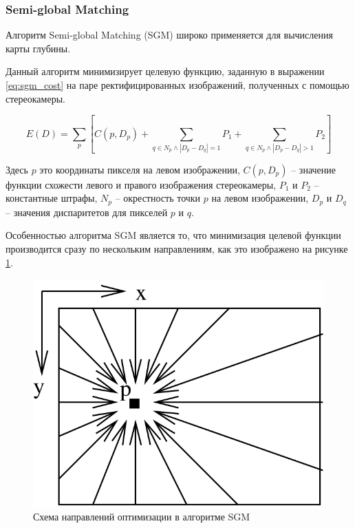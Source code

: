 \documentclass[aps,%
14pt,%
final,%
oneside,
onecolumn,%
musixtex, %
superscriptaddress,%
centertags]{extarticle} %
\begin{document}
\subsubsection{Semi-global Matching}
Алгоритм Semi-global Matching \cite{hirschmuller2005accurate} (SGM) широко применяется для вычисления карты глубины.

Данный алгоритм минимизирует целевую функцию, заданную в выражении \ref{eq:sgm_cost} на паре ректифицированных изображений, полученных с помощью стереокамеры.

\begin{equation} \label{eq:sgm_cost}
E(D)=\sum_p [C(p, D_p) + \sum_{q \in N_p \land |D_p - D_q| = 1} P_1 + \sum_{q \in N_p \land |D_p - D_q| > 1} P_2]
\end{equation}

Здесь $p$ это координаты пикселя на левом изображении, $C(p, D_p)$ -- значение функции схожести левого и правого изображения стереокамеры, $P_1$ и $P_2$ -- константные штрафы, $N_p$ -- окрестность точки $p$ на левом изображении, $D_p$ и $D_q$ -- значения диспаритетов для пикселей $p$ и $q$.

Особенностью алгоритма SGM является то, что минимизация целевой функции производится сразу по нескольким направлениям, как это изображено на рисунке \ref{fig:sgm_paths}.

\begin{figure}[htp]
\centering
\includegraphics[scale=0.3]{sgm_paths.png}
\caption{Схема направлений оптимизации в алгоритме SGM \cite{hirschmuller2005accurate}}
\label{fig:sgm_paths}
\end{figure}
\end{document}
